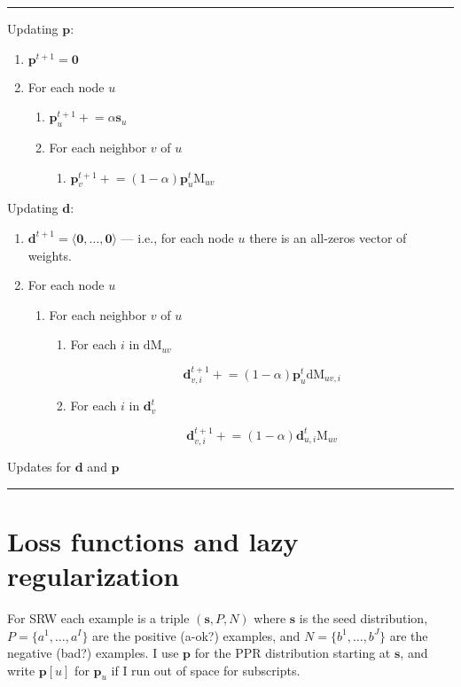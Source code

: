 \documentclass[12pt]{article}
\newcommand{\vek}[1]{\textbf{#1}}
\newcommand{\M}{\textrm{M}}
\newcommand{\dM}{\textrm{dM}}
\begin{document}
\begin{table} %
\hrule

Updating $\vek{p}$:
\begin{enumerate}
\item $\vek{p}^{t+1} = \vek{0}$
\item For each node $u$ 
  \begin{enumerate}
  \item $\vek{p}^{t+1}_u +\!\!= \alpha \vek{s}_u$
  \item For each neighbor $v$ of $u$
    \begin{enumerate}
    \item $\vek{p}^{t+1}_v +\!\!= (1-\alpha) \vek{p}^t_u \M_{uv} $
    \end{enumerate}
  \end{enumerate}
\end{enumerate}

Updating $\vek{d}$:
\begin{enumerate}
\item $\vek{d}^{t+1} = \langle \vek{0}, \ldots, \vek{0} \rangle$ --- i.e., for each node $u$ there is an all-zeros
  vector of weights.
\item For each node $u$ 
  \begin{enumerate}
  \item For each neighbor $v$ of $u$
    \begin{enumerate}
      \item For each $i$ in $\dM_{uv}$

      \[ \vek{d}^{t+1}_{v,i} +\!\!= (1-\alpha) \vek{p}^t_u \dM_{uv,i} \]
      \item For each $i$ in $\vek{d}^t_{v}$

      \[ \vek{d}^{t+1}_{v,i} +\!\!= (1-\alpha) \vek{d}^t_{u,i} \M_{uv} \]
    \end{enumerate}
  \end{enumerate}
\end{enumerate}
\caption{Updates for $\vek{d}$ and $\vek{p}$} \label{alg:updates}
\hrule
\end{table}

\section{Loss functions and lazy regularization}

For SRW each example is a triple $(\vek{s},P,N)$ where $\vek{s}$ is
the seed distribution, $P=\{a^1,\ldots,a^I\}$ are the positive (a-ok?)
examples, and $N=\{b^1,\ldots,b^J\}$ are the negative (bad?) examples.
I use $\vek{p}$ for the PPR distribution starting at $\vek{s}$, and
write $\vek{p}[u]$ for $\vek{p}_u$ if I run out of space for
subscripts.
\end{document}

